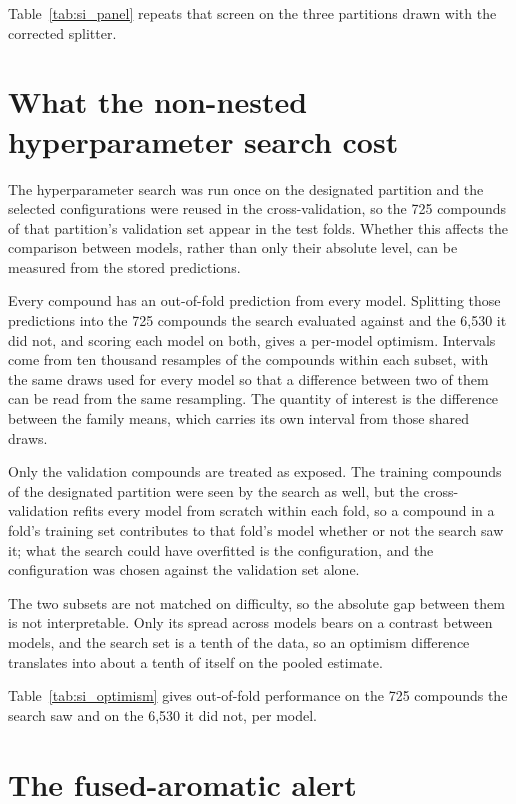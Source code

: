 \documentclass[journal=jcisd8,manuscript=suppinfo]{achemso}
\begin{document}
Table~\ref{tab:si_panel} repeats that screen on the three partitions drawn with the corrected
splitter.



\section{What the non-nested hyperparameter search cost}

The hyperparameter search was run once on the designated partition and the selected
configurations were reused in the cross-validation, so the 725 compounds of that partition's
validation set appear in the test folds. Whether this affects the comparison between models,
rather than only their absolute level, can be measured from the stored predictions.

Every compound has an out-of-fold prediction from every model. Splitting those predictions
into the 725 compounds the search evaluated against and the 6,530 it did not, and scoring each
model on both, gives a per-model optimism. Intervals come from ten thousand resamples of the
compounds within each subset, with the same draws used for every model so that a difference
between two of them can be read from the same resampling. The quantity of interest is the
difference between the family means, which carries its own interval from those shared draws.

Only the validation compounds are treated as exposed. The training compounds of the designated
partition were seen by the search as well, but the cross-validation refits every model from
scratch within each fold, so a compound in a fold's training set contributes to that fold's
model whether or not the search saw it; what the search could have overfitted is the
configuration, and the configuration was chosen against the validation set alone.

The two subsets are not matched on difficulty, so the absolute gap between them is not
interpretable. Only its spread across models bears on a contrast between models, and the
search set is a tenth of the data, so an optimism difference translates into about a tenth of
itself on the pooled estimate.

Table~\ref{tab:si_optimism} gives out-of-fold performance on the 725 compounds the search saw
and on the 6,530 it did not, per model.



\section{The fused-aromatic alert}
\end{document}
